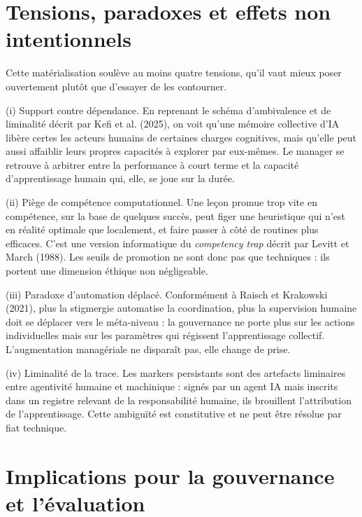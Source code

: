 \documentclass[12pt,a4paper]{article}
\begin{document}
\section{Tensions, paradoxes et effets non intentionnels}

Cette matérialisation soulève au moins quatre tensions, qu'il vaut mieux poser ouvertement plutôt que d'essayer de les contourner.

(i) Support contre dépendance. En reprenant le schéma d'ambivalence et de liminalité décrit par Kefi et al. (2025), on voit qu'une mémoire collective d'IA libère certes les acteurs humains de certaines charges cognitives, mais qu'elle peut aussi affaiblir leurs propres capacités à explorer par eux-mêmes. Le manager se retrouve à arbitrer entre la performance à court terme et la capacité d'apprentissage humain qui, elle, se joue sur la durée.

(ii) Piège de compétence computationnel. Une leçon promue trop vite en compétence, sur la base de quelques succès, peut figer une heuristique qui n'est en réalité optimale que localement, et faire passer à côté de routines plus efficaces. C'est une version informatique du \textit{competency trap} décrit par Levitt et March (1988). Les seuils de promotion ne sont donc pas que techniques : ils portent une dimension éthique non négligeable.

(iii) Paradoxe d'automation déplacé. Conformément à Raisch et Krakowski (2021), plus la stigmergie automatise la coordination, plus la supervision humaine doit se déplacer vers le méta-niveau : la gouvernance ne porte plus sur les actions individuelles mais sur les paramètres qui régissent l'apprentissage collectif. L'augmentation managériale ne disparaît pas, elle change de prise.

(iv) Liminalité de la trace. Les markers persistants sont des artefacts liminaires entre agentivité humaine et machinique : signés par un agent IA mais inscrits dans un registre relevant de la responsabilité humaine, ils brouillent l'attribution de l'apprentissage. Cette ambiguïté est constitutive et ne peut être résolue par fiat technique.

\section{Implications pour la gouvernance et l'évaluation}
\end{document}

